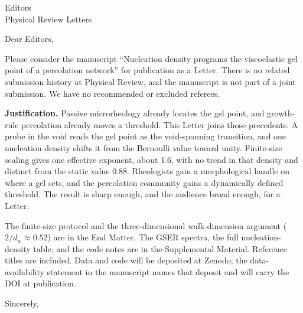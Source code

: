 \documentclass[11pt]{letter}
\date{\today}
\begin{document}
\begin{letter}{Editors\\Physical Review Letters}
\opening{Dear Editors,}

Please consider the manuscript ``Nucleation density programs the viscoelastic gel point of a percolation network'' for publication as a Letter. There is no related submission history at Physical Review, and the manuscript is not part of a joint submission. We have no recommended or excluded referees.

\textbf{Justification.}
Passive microrheology already locates the gel point, and growth-rule percolation already moves a threshold. This Letter joins those precedents. A probe in the void reads the gel point as the void-spanning transition, and one nucleation density shifts it from the Bernoulli value toward unity. Finite-size scaling gives one effective exponent, about 1.6, with no trend in that density and distinct from the static value 0.88. Rheologists gain a morphological handle on where a gel sets, and the percolation community gains a dynamically defined threshold. The result is sharp enough, and the audience broad enough, for a Letter.

The finite-size protocol and the three-dimensional walk-dimension argument ($2/d_w\approx0.52$) are in the End Matter. The GSER spectra, the full nucleation-density table, and the code notes are in the Supplemental Material. Reference titles are included. Data and code will be deposited at Zenodo; the data-availability statement in the manuscript names that deposit and will carry the DOI at publication.

\closing{Sincerely,}
\end{letter}
\end{document}

